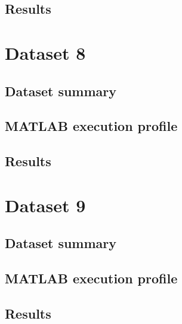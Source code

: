 \subsection{Results}

\section{Dataset 8}


\subsection{Dataset summary}

\subsection{MATLAB execution profile}

\subsection{Results}

\section{Dataset 9}


\subsection{Dataset summary}

\subsection{MATLAB execution profile}

\subsection{Results}

